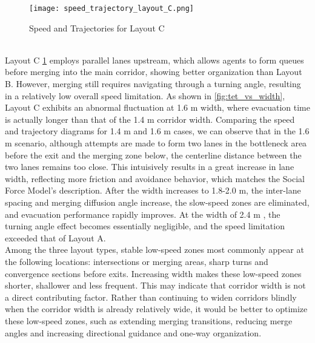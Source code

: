 \begin{figure}[h]
    \centering
    \texttt{[image: speed\_trajectory\_layout\_C.png]}
    \caption{Speed and Trajectories for Layout C}
    \label{fig:speed_trajectory_layout_C}
\end{figure}
\\Layout C \ref{fig:speed_trajectory_layout_C} employs parallel lanes upstream, which allows agents to form queues before merging into the main corridor, showing better organization than Layout B. However, merging still requires navigating through a turning angle, resulting in a relatively low overall speed limitation. As shown in \ref{fig:tet_vs_width}, Layout C exhibits an abnormal fluctuation at 1.6 m width, where evacuation time is actually longer than that of the 1.4 m corridor width. Comparing the speed and trajectory diagrams for 1.4 m and 1.6 m cases, we can observe that in the 1.6 m scenario, although attempts are made to form two lanes in the bottleneck area before the exit and the merging zone below, the centerline distance between the two lanes remains too close. This intuisively results in a great increase in lane width, reflecting more friction and avoidance behavior, which matches the Social Force Model's description. After the width increases to 1.8-2.0 m, the inter-lane spacing and merging diffusion angle increase, the slow-speed zones are eliminated, and evacuation performance rapidly improves. At the width of 2.4 m , the turning angle effect becomes essentially negligible, and the speed limitation exceeded that of Layout A.
\\Among the three layout types, stable low-speed zones most commonly appear at the following locations: intersections or merging areas, sharp turns and convergence sections before exits. Increasing width makes these low-speed zones shorter, shallower and less frequent. This may indicate that corridor width is not a direct contributing factor. Rather than continuing to widen corridors blindly when the corridor width is already relatively wide, it would be better to optimize these low-speed zones, such as extending merging transitions, reducing merge angles and increasing directional guidance and one-way organization.

